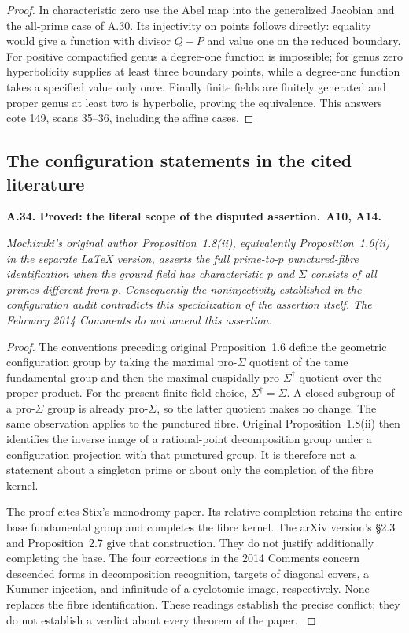 \documentclass[11pt,a4paper]{article}
\newenvironment{claim}[3]{\par\medskip\noindent\hypertarget{#1}{\textbf{#1. #2.}}\ \textbf{#3.}\par\nopagebreak\smallskip\begingroup\itshape}{\endgroup\par\smallskip}
\newcommand{\statementref}[1]{\hyperlink{#1}{#1}}
\begin{document}
\begin{proof}
In characteristic zero use the Abel map into the generalized
Jacobian and the all-prime case of \statementref{A.30}. Its
injectivity on points follows directly: equality would give a
function with divisor $Q-P$ and value one on the reduced boundary.
For positive compactified genus a degree-one function is impossible;
for genus zero hyperbolicity supplies at least three boundary points,
while a degree-one function takes a specified value only once.
Finally finite fields are finitely generated and proper genus at
least two is hyperbolic, proving the equivalence. This answers
cote 149, scans 35--36, including the affine cases.
\end{proof}



\subsection{The configuration statements in the cited literature}

\begin{claim}{A.34}{Proved: the literal scope of the disputed assertion}{A10, A14}
Mochizuki's original author Proposition~1.8(ii), equivalently
Proposition~1.6(ii) in the separate LaTeX version, asserts the full
prime-to-$p$ punctured-fibre identification when the ground field has
characteristic $p$ and $\Sigma$ consists of all primes different from $p$.
Consequently the noninjectivity established in the configuration audit
contradicts this specialization of the assertion itself. The February
2014 Comments do not amend this assertion.
\end{claim}
\begin{proof}
The conventions preceding original Proposition~1.6 define the geometric
configuration group by taking the maximal pro-$\Sigma$ quotient of the
tame fundamental group and then the maximal cuspidally pro-$\Sigma^\dagger$
quotient over the proper product. For the present finite-field choice,
$\Sigma^\dagger=\Sigma$. A closed subgroup of a pro-$\Sigma$ group is
already pro-$\Sigma$, so the latter quotient makes no change. The same
observation applies to the punctured fibre. Original Proposition~1.8(ii)
then identifies the inverse image of a rational-point decomposition
group under a configuration projection with that punctured group.
It is therefore not a statement about a singleton prime or about only
the completion of the fibre kernel.

The proof cites Stix's monodromy paper. Its relative completion retains
the entire base fundamental group and completes the fibre kernel.
The arXiv version's \S2.3 and Proposition~2.7 give that construction.
They do not justify additionally completing the base. The four corrections
in the 2014 Comments concern descended forms in decomposition recognition,
targets of diagonal covers, a Kummer injection, and infinitude of a
cyclotomic image, respectively. None replaces the fibre identification.
These readings establish the precise conflict; they do not establish a
verdict about every theorem of the paper.
\citep[original pp.~11,14--15]{LA_Mochizuki2007}
\citep{LA_Mochizuki2014,LA_Stix2005}
\end{proof}
\end{document}
